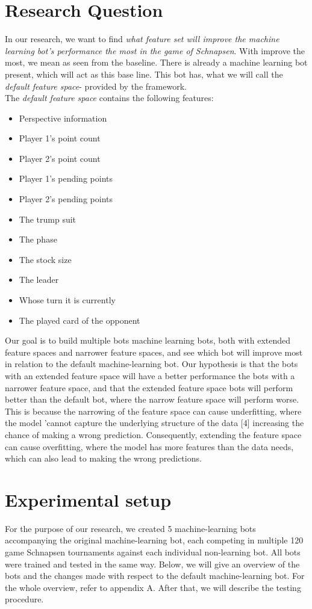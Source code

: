 \documentclass[a4paper,11pt]{article}
\begin{document}
\clearpage
\section{Research Question}
In our research, we want to find \textit{what feature set will improve the machine learning bot's performance the most in the game of Schnapsen}. With improve the most, we mean as seen from the baseline. There is already a machine learning bot present, which will act as this base line. This bot has, what we will call the \textit{default feature space}- provided by the framework.  \\

\noindent
The \textit{default feature space} contains the following features:
\begin{itemize}
\item Perspective information
\item Player 1's point count
\item Player 2's point count
\item Player 1's pending points
\item Player 2's pending points
\item The trump suit
\item The phase
\item The stock size
\item The leader
\item Whose turn it is currently
\item The played card of the opponent
\end{itemize}



\noindent
Our goal is to build multiple bots machine learning bots, both with extended feature spaces and narrower feature spaces, and see which bot will improve most in relation to the default machine-learning bot. Our hypothesis is that the bots with an extended feature space will have a better performance the bots with a narrower feature space, and that the extended feature space bots will perform better than the default bot, where the narrow feature space will perform worse. This is because the narrowing of the feature space can cause underfitting, where the model 'cannot capture the underlying structure of the data [4] increasing the chance of making a wrong prediction. Consequently, extending the feature space can cause overfitting, where the model has more features than the data needs, which can also lead to making the wrong predictions.


\clearpage
\section{Experimental setup}
For the purpose of our research, we created 5 machine-learning bots accompanying the original machine-learning bot, each competing in multiple 120 game Schnapsen tournaments against each individual non-learning bot. All bots were trained and tested in the same way. Below, we will give an overview of the bots and the changes made with respect to the default machine-learning bot. For the whole overview, refer to appendix A. After that, we will describe the testing procedure.
\end{document}
